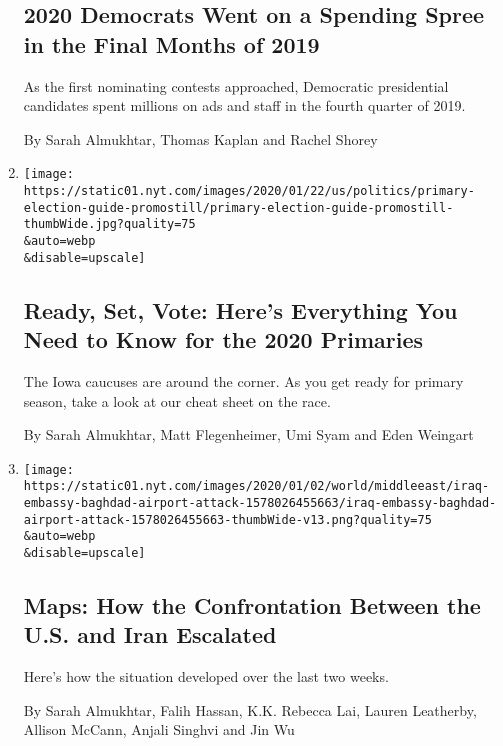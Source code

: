 \begin{enumerate}
  \hypertarget{2020-democrats-went-on-a-spending-spree-in-the-final-months-of-2019}{%
  \subsection{2020 Democrats Went on a Spending Spree in the Final
  Months of
  2019}\label{2020-democrats-went-on-a-spending-spree-in-the-final-months-of-2019}}

  As the first nominating contests approached, Democratic presidential
  candidates spent millions on ads and staff in the fourth quarter of
  2019.

  By Sarah Almukhtar, Thomas Kaplan and Rachel Shorey
\item
  \href{/interactive/2020/01/24/us/politics/presidential-primary-election-guide.html}{}

  \texttt{[image: https://static01.nyt.com/images/2020/01/22/us/politics/primary-election-guide-promostill/primary-election-guide-promostill-thumbWide.jpg?quality=75\\\&auto=webp\\\&disable=upscale]}

  \hypertarget{ready-set-vote-heres-everything-you-need-to-know-for-the-2020-primaries}{%
  \subsection{Ready, Set, Vote: Here's Everything You Need to Know for
  the 2020
  Primaries}\label{ready-set-vote-heres-everything-you-need-to-know-for-the-2020-primaries}}

  The Iowa caucuses are around the corner. As you get ready for primary
  season, take a look at our cheat sheet on the race.

  By Sarah Almukhtar, Matt Flegenheimer, Umi Syam and Eden Weingart
\item
  \href{/interactive/2020/01/03/world/middleeast/iraq-embassy-baghdad-airport-attack.html}{}

  \texttt{[image: https://static01.nyt.com/images/2020/01/02/world/middleeast/iraq-embassy-baghdad-airport-attack-1578026455663/iraq-embassy-baghdad-airport-attack-1578026455663-thumbWide-v13.png?quality=75\\\&auto=webp\\\&disable=upscale]}

  \hypertarget{maps-how-the-confrontation-between-the-us-and-iran-escalated}{%
  \subsection{Maps: How the Confrontation Between the U.S. and Iran
  Escalated}\label{maps-how-the-confrontation-between-the-us-and-iran-escalated}}

  Here's how the situation developed over the last two weeks.

  By Sarah Almukhtar, Falih Hassan, K.K. Rebecca Lai, Lauren Leatherby,
  Allison McCann, Anjali Singhvi and Jin Wu
\end{enumerate}

